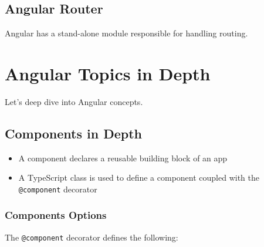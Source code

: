\documentclass[12pt,]{article}
\providecommand{\tightlist}{%
  \setlength{\itemsep}{0pt}\setlength{\parskip}{0pt}}
\begin{document}
\subsection{Angular Router}\label{angular-router}

Angular has a stand-alone module responsible for handling routing.

\section{Angular Topics in Depth}\label{angular-topics-in-depth}

Let's deep dive into Angular concepts.

\subsection{Components in Depth}\label{components-in-depth}

\begin{itemize}
\tightlist
\item
  A component declares a reusable building block of an app
\item
  A TypeScript class is used to define a component coupled with the
  \texttt{@component} decorator
\end{itemize}

\subsubsection{Components Options}\label{components-options}

The \texttt{@component} decorator defines the following:
\end{document}

